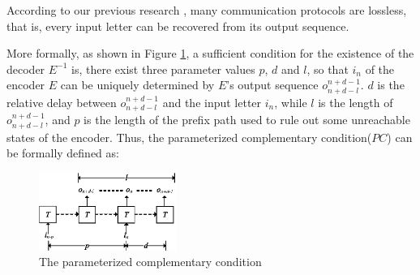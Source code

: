 \documentclass[journal]{IEEEtran}
\begin{document}
According to our previous research \cite{ShengYuShen:iccad09,ShengYuShen:tcad,ShengYuShen:fmcad10},
many communication protocols are lossless,
that is,
every input letter can be recovered from its output sequence.

More formally,
as shown in Figure \ref{t1},
a sufficient condition for the existence of the decoder $E^{-1}$ is,
there exist three parameter values $p$, $d$ and $l$,
so that $i_n$ of the encoder $E$ can be uniquely determined by $E$'s output sequence $o_{n+d-l}^{n+d-1}$.
$d$ is the relative delay between $o_{n+d-l}^{n+d-1}$ and the input letter $i_n$,
while $l$ is the length of $o_{n+d-l}^{n+d-1}$,
and $p$ is the length of the prefix path used to rule out some unreachable states of the encoder.
Thus,
the parameterized complementary condition($PC$)\cite{ShengYuShen:iccad09} can be formally defined  as:

\begin{figure}[t]
\begin{center}
\includegraphics[width=0.4\textwidth]{t1}
\end{center}
\caption{The parameterized complementary condition}
  \label{t1}
\end{figure}
\end{document}
